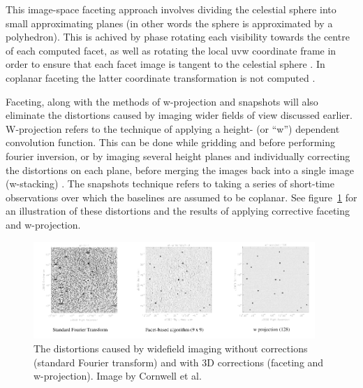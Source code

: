 \documentclass[a4paper, two column]{article}
\begin{document}
This image-space faceting approach involves dividing the celestial sphere into small approximating planes (in other words the sphere is approximated by a polyhedron). This is achived by phase rotating each visibility
towards the centre of each computed facet, as well as rotating the local uvw coordinate frame in order to ensure that each facet image is tangent to the celestial sphere \cite{cornwell1992radio}. In coplanar faceting
the latter coordinate transformation is not computed \cite{AIPS113}.

Faceting, along with the methods of w-projection and snapshots will also eliminate the distortions caused by imaging wider fields of view discussed earlier. W-projection refers to the technique of applying a height- (or ``w'')
dependent convolution function. This can be done while gridding and before performing fourier inversion, or by imaging several height planes and individually correcting the distortions on each plane, before merging the images back
into a single image (w-stacking) \cite{cornwell2005w}. The snapshots technique refers to taking a series of short-time observations over which the baselines are assumed to be coplanar. See figure~\ref{FIG_3D_DISTORTIONS} for an 
illustration of these distortions and the results of applying corrective faceting and w-projection.

\begin{figure}[ht]
 \begin{mdframed}
 \centering
 \includegraphics[width=0.95\textwidth]{3d_correction.png}
 \caption{The distortions caused by widefield imaging without corrections (standard Fourier transform) and with 3D corrections (faceting and w-projection). Image by Cornwell et al. \cite{1416440}}
  \label{FIG_3D_DISTORTIONS}
 \end{mdframed}
\end{figure}
\end{document}
